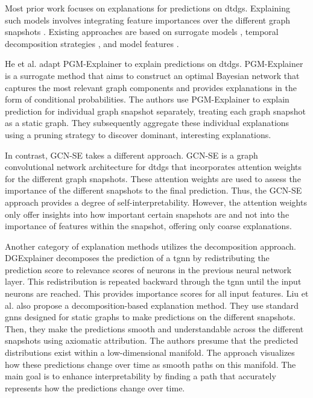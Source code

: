 Most prior work focuses on explanations for predictions on \glspl{dtdg}. Explaining such models involves integrating feature importances over the different graph snapshots \cite{he_explainer_2022}. Existing approaches are based on surrogate models \cite{he_explainer_2022}, temporal decomposition strategies \cite{xie_explaining_2022, liu_differential_2023}, and model features \cite{fan_gcn-se_2021}.

He et al. \cite{he_explainer_2022} adapt PGM-Explainer \cite{vu_pgm-explainer_2020} to explain predictions on \glspl{dtdg}. PGM-Explainer is a surrogate method that aims to construct an optimal Bayesian network that captures the most relevant graph components and provides explanations in the form of conditional probabilities. The authors use PGM-Explainer to explain prediction for individual graph snapshot separately, treating each graph snapshot as a static graph. They subsequently aggregate these individual explanations using a pruning strategy to discover dominant, interesting explanations.

In contrast, GCN-SE \cite{fan_gcn-se_2021} takes a different approach. GCN-SE is a graph convolutional network architecture for \glspl{dtdg} that incorporates attention weights for the different graph snapshots. These attention weights are used to assess the importance of the different snapshots to the final prediction. Thus, the GCN-SE approach provides a degree of self-interpretability. However, the attention weights only offer insights into how important certain snapshots are and not into the importance of features within the snapshot, offering only coarse explanations.

Another category of explanation methods utilizes the decomposition approach. DGExplainer \cite{xie_explaining_2022} decomposes the prediction of a \gls{tgnn} by redistributing the prediction score to relevance scores of neurons in the previous neural network layer. This redistribution is repeated backward through the \gls{tgnn} until the input neurons are reached. This provides importance scores for all input features. Liu et al. \cite{liu_differential_2023} also propose a decomposition-based explanation method. They use standard \glspl{gnn} designed for static graphs to make predictions on the different snapshots. Then, they make the predictions smooth and understandable across the different snapshots using axiomatic attribution. The authors presume that the predicted distributions exist within a low-dimensional manifold. The approach visualizes how these predictions change over time as smooth paths on this manifold. The main goal is to enhance interpretability by finding a path that accurately represents how the predictions change over time.



